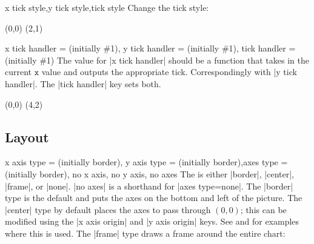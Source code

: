 \begin{sseqdata}[name = basic, cohomological Serre grading]
\begin{stylekeylist}{x tick style,y tick style,tick style}
Change the tick style:
\begin{codeexample}[width = 7cm]
\begin{sseqpage}[ tick style = { blue, font = \tiny } ]
\class(0,0) \class(2,1)
\end{sseqpage}
\end{codeexample}
\end{stylekeylist}

\begin{keylist}{x tick handler =  (initially \#1), y tick handler =  (initially \#1), tick handler =  (initially \#1)}
The value for |x tick handler| should be a function that takes in the current $\mathtt{x}$ value and outputs the appropriate tick. Correspondingly with |y tick handler|. The |tick handler| key sets both.
\begin{codeexample}[width = 7cm]
\begin{sseqpage}[ x range = {0}{4}, yscale = 1.78,
    x tick handler = {
        \ifnum#1 = 0\relax
            0
        \else
            \ifnum#1 = 1\relax
                \protect\vphantom{2}n
            \else
                #1n
            \fi
        \fi
    }
]
\class(0,0)
\class(4,2)
\end{sseqpage}
\end{codeexample}
\end{keylist}

\subsection{Layout}
\begin{keylist}{x axis type =  (initially border), y axis type =  (initially border),axes type =  (initially border), no x axis, no y axis, no axes}
The  is either |border|, |center|, |frame|, or |none|. |no axes| is a shorthand for |axes type=none|. The |border| type is the default and puts the axes on the bottom and left of the picture. The |center| type by default places the axes to pass through $(0,0)$; this can be modified using the |x axis origin| and |y axis origin| keys. See  and  for examples where this is used. The |frame| type draws a frame around the entire chart:


\end{keylist}
\end{sseqdata}
